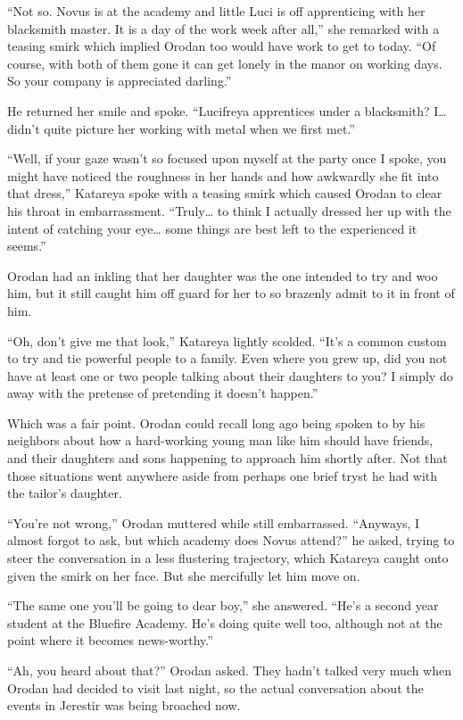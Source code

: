 \documentclass[a4paper,10pt]{book}
\begin{document}
“Not so. Novus is at the academy and little Luci is off apprenticing with her blacksmith master. It is a day of the work week after all,” she remarked with a teasing smirk which implied Orodan too would have work to get to today. “Of course, with both of them gone it can get lonely in the manor on working days. So your company is appreciated darling.”\par
He returned her smile and spoke. “Lucifreya apprentices under a blacksmith? I… didn’t quite picture her working with metal when we first met.”\par
“Well, if your gaze wasn’t so focused upon myself at the party once I spoke, you might have noticed the roughness in her hands and how awkwardly she fit into that dress,” Katareya spoke with a teasing smirk which caused Orodan to clear his throat in embarrassment. “Truly… to think I actually dressed her up with the intent of catching your eye… some things are best left to the experienced it seems.”\par
Orodan had an inkling that her daughter was the one intended to try and woo him, but it still caught him off guard for her to so brazenly admit to it in front of him.\par
“Oh, don’t give me that look,” Katareya lightly scolded. “It’s a common custom to try and tie powerful people to a family. Even where you grew up, did you not have at least one or two people talking about their daughters to you? I simply do away with the pretense of pretending it doesn’t happen.”\par
Which was a fair point. Orodan could recall long ago being spoken to by his neighbors about how a hard-working young man like him should have friends, and their daughters and sons happening to approach him shortly after. Not that those situations went anywhere aside from perhaps one brief tryst he had with the tailor’s daughter.\par
“You’re not wrong,” Orodan muttered while still embarrassed. “Anyways, I almost forgot to ask, but which academy does Novus attend?” he asked, trying to steer the conversation in a less flustering trajectory, which Katareya caught onto given the smirk on her face. But she mercifully let him move on.\par
“The same one you’ll be going to dear boy,” she answered. “He’s a second year student at the Bluefire Academy. He’s doing quite well too, although not at the point where it becomes news-worthy.”\par
“Ah, you heard about that?” Orodan asked. They hadn’t talked very much when Orodan had decided to visit last night, so the actual conversation about the events in Jerestir was being broached now.\par
\end{document}
